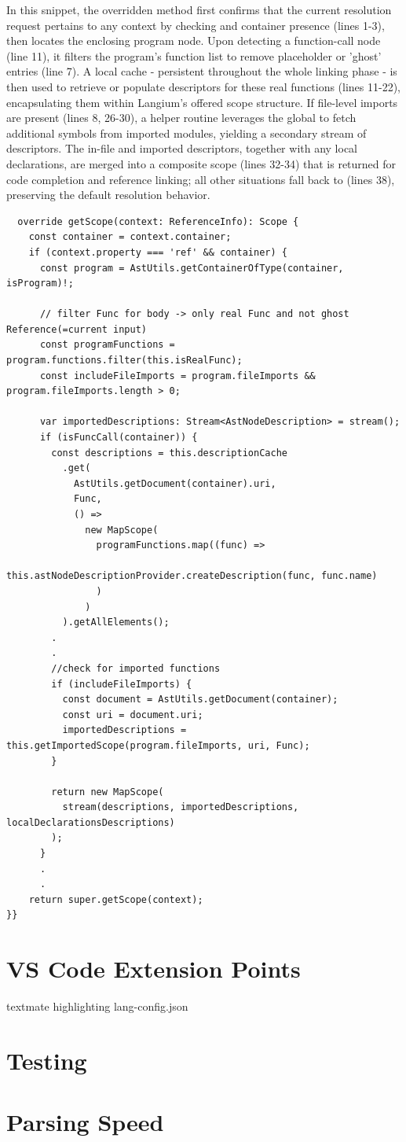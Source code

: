 In this snippet, the overridden  method first confirms that the current resolution request pertains to any  context by checking
 and container presence (lines 1-3), then locates the enclosing program node. Upon detecting a function-call node (line 11), it filters the program's
function list to remove placeholder or 'ghost' entries (line 7). A local cache - persistent throughout the whole linking phase - is
then used to retrieve or populate descriptors for these real functions (lines 11-22), encapsulating them within Langium's offered scope structure. If file-level imports are present
(lines 8, 26-30), a helper routine leverages the global  to fetch additional symbols from imported modules, yielding a secondary stream of descriptors.
The in-file and imported descriptors, together with any local declarations, are merged into a composite scope (lines 32-34) that is returned for code completion and reference
linking; all other situations fall back to  (lines 38), preserving the default resolution behavior.

\begin{verbatim}
  override getScope(context: ReferenceInfo): Scope {
    const container = context.container;
    if (context.property === 'ref' && container) {
      const program = AstUtils.getContainerOfType(container, isProgram)!;

      // filter Func for body -> only real Func and not ghost Reference(=current input)
      const programFunctions = program.functions.filter(this.isRealFunc);
      const includeFileImports = program.fileImports && program.fileImports.length > 0;

      var importedDescriptions: Stream<AstNodeDescription> = stream();
      if (isFuncCall(container)) {
        const descriptions = this.descriptionCache
          .get(
            AstUtils.getDocument(container).uri,
            Func,
            () =>
              new MapScope(
                programFunctions.map((func) =>
                  this.astNodeDescriptionProvider.createDescription(func, func.name)
                )
              )
          ).getAllElements();
        .
        .      
        //check for imported functions
        if (includeFileImports) {
          const document = AstUtils.getDocument(container);
          const uri = document.uri;
          importedDescriptions = this.getImportedScope(program.fileImports, uri, Func);
        }

        return new MapScope(
          stream(descriptions, importedDescriptions, localDeclarationsDescriptions)
        );
      } 
      .
      .
    return super.getScope(context);
}}
\end{verbatim}

\section{VS Code Extension Points}
textmate highlighting lang-config.json
\section{Testing}
\section{Parsing Speed}